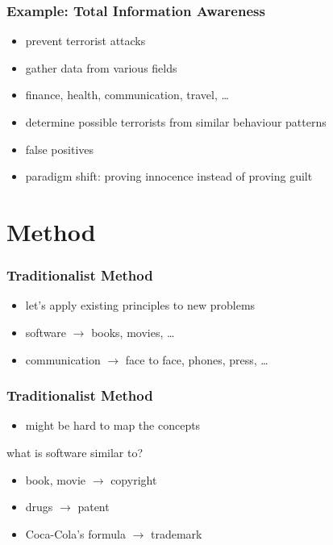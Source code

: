 \documentclass[dvipsnames]{beamer}
\theoremstyle{plain}
\begin{document}
\begin{frame}
  \frametitle{Example: Total Information Awareness}

  \begin{itemize}
    \item prevent terrorist attacks

    \medskip
    \item gather data from various fields
    \item finance, health, communication, travel, \ldots
    \item determine possible terrorists from similar behaviour patterns

    \bigskip
    \item false positives
    \item paradigm shift: proving innocence instead of proving guilt
  \end{itemize}
\end{frame}

\section{Method}

\begin{frame}
  \frametitle{Traditionalist Method}

  \begin{itemize}
    \item let's apply existing principles to new problems

    \bigskip
    \item software $\rightarrow$ books, movies, \ldots
    \item communication $\rightarrow$ face to face, phones, press, \ldots
  \end{itemize}
\end{frame}

\begin{frame}
  \frametitle{Traditionalist Method}

  \begin{itemize}
    \item might be hard to map the concepts
  \end{itemize}

  \begin{exampleblock}{what is software similar to?}
    \begin{itemize}
      \item book, movie $\rightarrow$ copyright
      \item drugs $\rightarrow$ patent
      \item Coca-Cola's formula $\rightarrow$ trademark
    \end{itemize}
  \end{exampleblock}
\end{frame}
\end{document}
